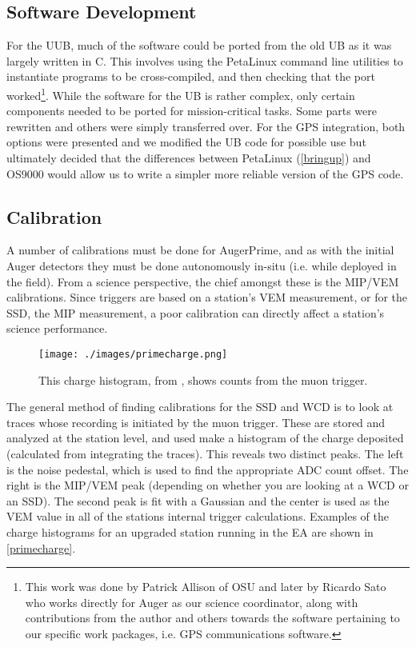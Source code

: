 \subsection{Software Development}
For the UUB, much of the software could be ported from the old UB as it was largely written in C. This involves using the PetaLinux command line utilities to instantiate programs to be cross-compiled, and then checking that the port worked\footnote{This work was done by Patrick Allison of OSU and later by Ricardo Sato who works directly for Auger as our science coordinator, along with contributions from the author and others towards the software pertaining to our specific work packages, i.e. GPS communications software.}. While the software for the UB is rather complex, only certain components needed to be ported for mission-critical tasks. Some parts were rewritten and others were simply transferred over. For the GPS integration, both options were presented and we modified the UB code for possible use but ultimately decided that the differences between PetaLinux (\autoref{bringup}) and OS9000 would allow us to write a simpler more reliable version of the GPS code.

\subsection{Calibration}
\label{calib}
A number of calibrations must be done for AugerPrime, and as with the initial Auger detectors they must be done autonomously in-situ (i.e. while deployed in the field). From a science perspective, the chief amongst these is the MIP/VEM calibrations. Since triggers are based on a station's VEM measurement, or for the SSD, the MIP measurement, a poor calibration can directly affect a station's science performance. 
\begin{figure}[h!]
\begin{center}
\texttt{[image: ./images/primecharge.png]}
\caption[AugerPrime Charge Histograms]{This charge histogram, from \textcite{zizhao}, shows counts from the muon trigger. }
\label{primecharge}
\end{center}
\end{figure}
The general method of finding calibrations for the SSD and WCD is to look at traces whose recording is initiated by the muon trigger. These are stored and analyzed at the station level, and used make a histogram of the charge deposited (calculated from integrating the traces). This reveals two distinct peaks. The left is the noise pedestal, which is used to find the appropriate ADC count offset. The right is the MIP/VEM peak (depending on whether you are looking at a WCD or an SSD). The second peak is fit with a Gaussian and the center is used as the VEM value in all of the stations internal trigger calculations. Examples of the charge histograms for an upgraded station running in the EA are shown in \autoref{primecharge}. 

